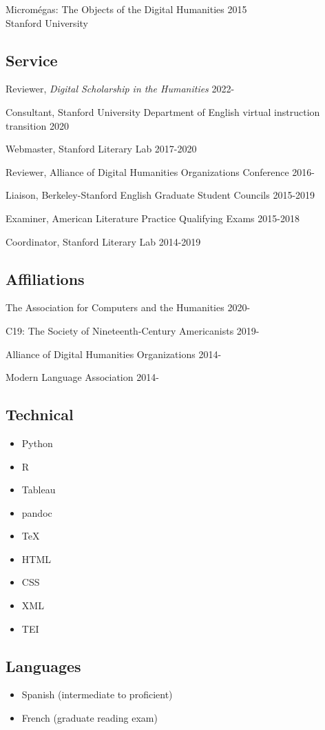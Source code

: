 \documentclass[
  12pt,
  letterpaper,
]{article}
\providecommand{\tightlist}{%
  \setlength{\itemsep}{0pt}\setlength{\parskip}{0pt}}
\begin{document}
Micromégas: The Objects of the Digital Humanities \hfill 2015\\
\hspace*{0.333em} Stanford University

\hypertarget{service}{%
\subsection{Service}\label{service}}

Reviewer, \emph{Digital Scholarship in the Humanities} \hfill 2022-

Consultant, Stanford University Department of English virtual
instruction transition \hfill 2020

Webmaster, Stanford Literary Lab \hfill 2017-2020

Reviewer, Alliance of Digital Humanities Organizations Conference
\hfill 2016-

Liaison, Berkeley-Stanford English Graduate Student Councils
\hfill 2015-2019

Examiner, American Literature Practice Qualifying Exams \hfill 2015-2018

Coordinator, Stanford Literary Lab \hfill 2014-2019

\hypertarget{affiliations}{%
\subsection{Affiliations}\label{affiliations}}

The Association for Computers and the Humanities \hfill 2020-

C19: The Society of Nineteenth-Century Americanists \hfill 2019-

Alliance of Digital Humanities Organizations \hfill 2014-

Modern Language Association \hfill 2014-

\hypertarget{technical}{%
\subsection{Technical}\label{technical}}

\begin{itemize}
\tightlist
\item
  Python
\item
  R
\item
  Tableau
\item
  pandoc
\item
  TeX
\item
  HTML
\item
  CSS
\item
  XML
\item
  TEI
\end{itemize}

\hypertarget{languages}{%
\subsection{Languages}\label{languages}}

\begin{itemize}
\tightlist
\item
Spanish (intermediate to proficient)
\item
French (graduate reading exam)
\end{itemize}
\end{document}
